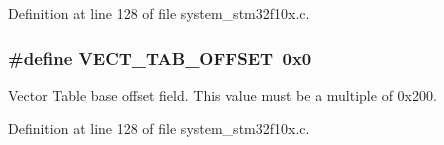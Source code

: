 Definition at line 128 of file system\+\_\+stm32f10x.\+c.

\subsubsection[{\texorpdfstring{V\+E\+C\+T\+\_\+\+T\+A\+B\+\_\+\+O\+F\+F\+S\+ET}{VECT_TAB_OFFSET}}]{\setlength{\rightskip}{0pt plus 5cm}\#define V\+E\+C\+T\+\_\+\+T\+A\+B\+\_\+\+O\+F\+F\+S\+ET~0x0}\hypertarget{group___s_t_m32_f10x___system___private___defines_ga40e1495541cbb4acbe3f1819bd87a9fe}{}\label{group___s_t_m32_f10x___system___private___defines_ga40e1495541cbb4acbe3f1819bd87a9fe}
Vector Table base offset field. This value must be a multiple of 0x200. 

Definition at line 128 of file system\+\_\+stm32f10x.\+c.

